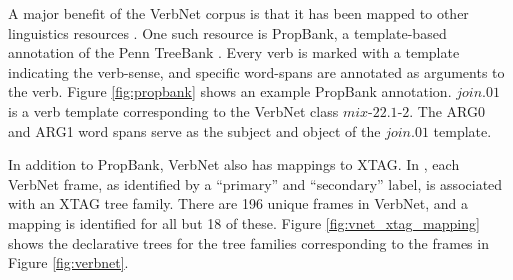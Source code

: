 \documentclass[11pt,a4paper]{article}
\begin{document}
A major benefit of the VerbNet corpus is that it has been mapped to other
linguistics resources \cite{verbnet}. One such resource is PropBank, a template-based annotation of the Penn TreeBank \cite{propbank}. Every verb is marked with
a template indicating the verb-sense, and specific word-spans are annotated as
arguments to the verb. Figure \ref{fig:propbank} shows an example PropBank
annotation. $join.01$ is a verb template corresponding to the VerbNet class
$mix\text{-}22.1\text{-}2$. The ARG0 and ARG1 word spans serve as the subject and
object of the $join.01$ template.

In addition to PropBank, VerbNet also has mappings to XTAG. In
\cite{ryant2004assigning}, each VerbNet frame, as identified by a ``primary''
and ``secondary'' label, is associated with an XTAG tree family. There are 196
unique frames in VerbNet, and a mapping is identified for all but 18 of these.
Figure \ref{fig:vnet_xtag_mapping} shows the declarative trees for the tree
families corresponding to the frames in Figure \ref{fig:verbnet}.
\end{document}
